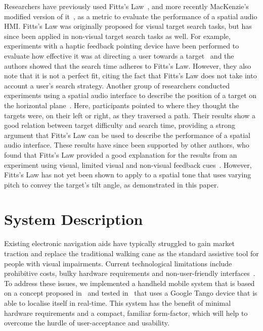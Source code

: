 \documentclass[]{interact}
\begin{document}
Researchers have previously used Fitts's Law~\citep{fitts1954information}, and more recently MacKenzie's modified version of it~\citep{mackenzie1992fitts}, as a metric to evaluate the performance of a spatial audio HMI\@.
Fitts's Law was originally proposed for visual target search tasks, but has since been applied in non-visual target search tasks as well.
For example, experiments with a haptic feedback pointing device have been performed to evaluate how effective it was at directing a user towards a target~\citep{ahmaniemi2009augmented} and the authors showed that the search time adheres to Fitts's Law.
However, they also note that it is not a perfect fit, citing the fact that Fitts's Law does not take into account a user's search strategy.
Another group of researchers conducted experiments using a spatial audio interface to describe the position of a target on the horizontal plane~\citep{marentakis2006effects}.
Here, participants pointed to where they thought the targets were, on their left or right, as they traversed a path.
Their results show a good relation between target difficulty and search time, providing a strong argument that Fitts's Law can be used to describe the performance of a spatial audio interface.
These results have since been supported by other authors, who found that Fitts's Law provided a good explanation for the results from an experiment using visual, limited visual and non-visual feedback cues~\citep{wu2010fitts}.
However, Fitts's Law has not yet been shown to apply to a spatial tone that uses varying pitch to convey the target's tilt angle, as demonstrated in this paper.

\section{System Description}\label{sec:system-description}

Existing electronic navigation aids have typically struggled to gain market traction and replace the traditional walking cane as the standard assistive tool for people with visual impairments.
Current technological limitations include prohibitive costs, bulky hardware requirements and non-user-friendly interfaces~\citep{golledge2004stated,yusif2016older,arditi2013user}.
To address these issues, we implemented a handheld mobile system that is based on a concept proposed in~\citep{lock2017portable,lock2019active} and tested in~\citep{lock2019bone} that uses a Google Tango device that is able to localise itself in real-time.
This system has the benefit of minimal hardware requirements and a compact, familiar form-factor, which will help to overcome the hurdle of user-acceptance and usability.
\end{document}
